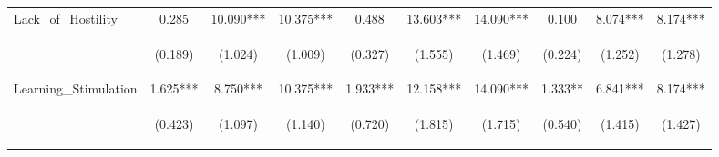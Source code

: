\begin{tabular}{lccccccccc}
\noalign{\smallskip}Lack_of_Hostility & 0.285 & 10.090*** & 10.375*** & 0.488 & 13.603*** & 14.090*** & 0.100 & 8.074*** & 8.174***\\
 & \begin{footnotesize}(0.189)\end{footnotesize} & \begin{footnotesize}(1.024)\end{footnotesize} & \begin{footnotesize}(1.009)\end{footnotesize} & \begin{footnotesize}(0.327)\end{footnotesize} & \begin{footnotesize}(1.555)\end{footnotesize} & \begin{footnotesize}(1.469)\end{footnotesize} & \begin{footnotesize}(0.224)\end{footnotesize} & \begin{footnotesize}(1.252)\end{footnotesize} & \begin{footnotesize}(1.278)\end{footnotesize}\\
\noalign{\smallskip}Learning_Stimulation & 1.625*** & 8.750*** & 10.375*** & 1.933*** & 12.158*** & 14.090*** & 1.333** & 6.841*** & 8.174***\\
 & \begin{footnotesize}(0.423)\end{footnotesize} & \begin{footnotesize}(1.097)\end{footnotesize} & \begin{footnotesize}(1.140)\end{footnotesize} & \begin{footnotesize}(0.720)\end{footnotesize} & \begin{footnotesize}(1.815)\end{footnotesize} & \begin{footnotesize}(1.715)\end{footnotesize} & \begin{footnotesize}(0.540)\end{footnotesize} & \begin{footnotesize}(1.415)\end{footnotesize} & \begin{footnotesize}(1.427)\end{footnotesize}\\

\end{tabular}

